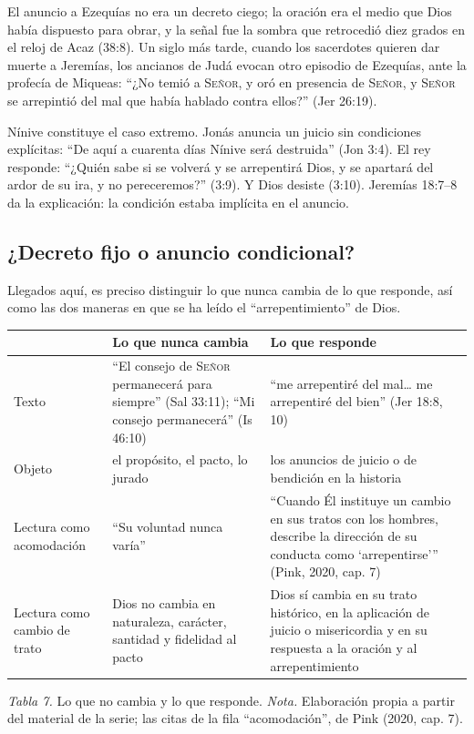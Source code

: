 \documentclass[11pt,letterpaper]{article}
\newcommand{\SENOR}{\textsc{Señor}}
\begin{document}
El anuncio a Ezequías no era un decreto ciego; la oración era el medio que Dios había dispuesto para obrar, y la señal fue la sombra que retrocedió diez grados en el reloj de Acaz (38:8). Un siglo más tarde, cuando los sacerdotes quieren dar muerte a Jeremías, los ancianos de Judá evocan otro episodio de Ezequías, ante la profecía de Miqueas: ``¿No temió a \SENOR, y oró en presencia de \SENOR, y \SENOR{} se arrepintió del mal que había hablado contra ellos?'' (Jer 26:19).

Nínive constituye el caso extremo. Jonás anuncia un juicio sin condiciones explícitas: ``De aquí a cuarenta días Nínive será destruida'' (Jon 3:4). El rey responde: ``¿Quién sabe si se volverá y se arrepentirá Dios, y se apartará del ardor de su ira, y no pereceremos?'' (3:9). Y Dios desiste (3:10). Jeremías 18:7--8 da la explicación: la condición estaba implícita en el anuncio.

\subsection{¿Decreto fijo o anuncio condicional?}
Llegados aquí, es preciso distinguir lo que nunca cambia de lo que responde, así como las dos maneras en que se ha leído el ``arrepentimiento'' de Dios.

\begin{center}\small\renewcommand{\arraystretch}{1.2}
\begin{tabular}{@{}L{2.4cm}L{5.6cm}L{5.8cm}@{}}
\toprule
 & \textbf{Lo que nunca cambia} & \textbf{Lo que responde} \\ \midrule
Texto & ``El consejo de \SENOR{} permanecerá para siempre'' (Sal 33:11); ``Mi consejo permanecerá'' (Is 46:10) & ``me arrepentiré del mal\ldots{} me arrepentiré del bien'' (Jer 18:8, 10) \\
Objeto & el propósito, el pacto, lo jurado & los anuncios de juicio o de bendición en la historia \\
Lectura como acomodación & ``Su voluntad nunca varía'' & ``Cuando Él instituye un cambio en sus tratos con los hombres, describe la dirección de su conducta como `arrepentirse'{}'' (Pink, 2020, cap. 7) \\
Lectura como cambio de trato & Dios no cambia en naturaleza, carácter, santidad y fidelidad al pacto & Dios sí cambia en su trato histórico, en la aplicación de juicio o misericordia y en su respuesta a la oración y al arrepentimiento \\
\bottomrule
\end{tabular}\par
{\footnotesize\color{gris}\textit{Tabla 7.} Lo que no cambia y lo que responde. \textit{Nota.} Elaboración propia a partir del material de la serie; las citas de la fila ``acomodación'', de Pink (2020, cap. 7).}
\end{center}
\end{document}
